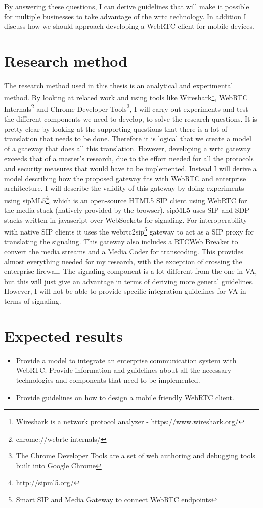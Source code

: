 By answering these questions, I can derive guidelines that will make it possible for multiple businesses to take advantage of the \gls{wrtc} technology. In addition I discuss how we should approach developing a WebRTC client for mobile devices.


\section{Research method}
The research method used in this thesis is an analytical and experimental method. By looking at related work and using tools like Wireshark\footnote{Wireshark is a network protocol analyzer - https://www.wireshark.org/}, WebRTC Internals\footnote{chrome://webrtc-internals/} and Chrome Developer Tools\footnote{The Chrome Developer Tools are a set of web authoring and debugging tools built into Google Chrome}, I will carry out experiments and test the different components we need to develop, to solve the research questions. It is pretty clear by looking at the supporting questions that there is a lot of translation that needs to be done. Therefore it is logical that we create a model of a gateway that does all this translation. However, developing a \gls{wrtc} gateway exceeds that of a master's research, due to the effort needed for all the protocols and security measures that would have to be implemented. Instead I will derive a model describing how the proposed gateway fits with WebRTC and enterprise architecture. I will describe the validity of this gateway by doing experiments using sipML5\footnote{http://sipml5.org/}, which is an open-source HTML5 SIP client using WebRTC for the media stack (natively provided by the browser). sipML5 uses SIP and SDP stacks written in javascript over WebSockets for signaling. For interoperability with native SIP clients it uses the webrtc2sip\footnote{Smart SIP and Media Gateway to connect WebRTC endpoints} gateway to act as a SIP proxy for translating the signaling. This gateway also includes a RTCWeb Breaker to convert the media streams and a Media Coder for transcoding. This provides almost everything needed for my research, with the exception of crossing the enterprise firewall. The signaling component is a lot different from the one in VA, but this will just give an advantage in terms of deriving more general guidelines. However, I will not be able to provide specific integration guidelines for VA in terms of signaling.

\section{Expected results}

\begin{itemize}
		\item Provide a model to integrate an enterprise communication system with WebRTC. Provide information and guidelines about all the necessary technologies and components that need to be implemented.
		\item Provide guidelines on how to design a mobile friendly WebRTC client.
\end{itemize}
